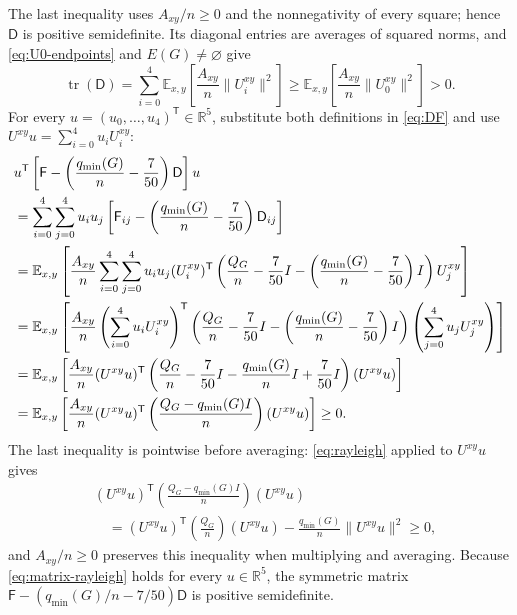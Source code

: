 \documentclass[11pt]{article}
\newcommand{\E}{\mathbb E}
\newcommand{\R}{\mathbb R}
\newcommand{\tr}{\operatorname{tr}}
\newcommand{\qmin}{q_{\min}}
\begin{document}
The last inequality uses $A_{xy}/n\geq0$ and the nonnegativity of every square;
hence $\mathsf D$ is positive semidefinite.
Its diagonal entries are averages of squared norms, and \eqref{eq:U0-endpoints} and $E(G)\ne\varnothing$ give
\begin{equation}\label{eq:positive-D}
\tr(\mathsf D)=\sum_{i=0}^4\E_{x,y}\left[\frac{A_{xy}}n\|U_i^{xy}\|^2\right]
\geq\E_{x,y}\left[\frac{A_{xy}}n\|U_0^{xy}\|^2\right]>0.
\end{equation}
For every $u=(u_0,\ldots,u_4)^{\mathsf T}\in\R^5$,
substitute both definitions in \eqref{eq:DF} and use
$U^{xy}u=\sum_{i=0}^4u_iU_i^{xy}$:
\begin{align}
&u^{\mathsf T}\left[\mathsf F-
\left(\frac{\qmin(G)}n-\frac7{50}\right)\mathsf D\right]u\notag\\
&=\sum_{i=0}^4\sum_{j=0}^4u_i u_j
\left[\mathsf F_{ij}-\left(\frac{\qmin(G)}n-\frac7{50}\right)\mathsf D_{ij}\right]\notag\\
&=\E_{x,y}\left[\frac{A_{xy}}n
\sum_{i=0}^4\sum_{j=0}^4u_i u_j
(U_i^{xy})^{\mathsf T}
\left(\frac{Q_G}{n}
-\frac7{50}I-\left(\frac{\qmin(G)}n-\frac7{50}\right)I\right)
U_j^{xy}\right]\notag\\
&=\E_{x,y}\left[\frac{A_{xy}}n
\left(\sum_{i=0}^4u_iU_i^{xy}\right)^{\mathsf T}
\left(\frac{Q_G}{n}
-\frac7{50}I-\left(\frac{\qmin(G)}n-\frac7{50}\right)I\right)
\left(\sum_{j=0}^4u_jU_j^{xy}\right)\right]\notag\\
&=\E_{x,y}\left[\frac{A_{xy}}n
(U^{xy}u)^{\mathsf T}
\left(\frac{Q_G}{n}
-\frac7{50}I-\frac{\qmin(G)}nI+\frac7{50}I\right)
(U^{xy}u)\right]\notag\\
&=\E_{x,y}\left[\frac{A_{xy}}n
(U^{xy}u)^{\mathsf T}
\left(\frac{Q_G-\qmin(G)I}{n}\right)
(U^{xy}u)\right]\geq0.
\label{eq:matrix-rayleigh}
\end{align}
The last inequality is pointwise before averaging: \eqref{eq:rayleigh}
applied to $U^{xy}u$ gives
\[
\begin{aligned}
&(U^{xy}u)^{\mathsf T}
\left(\frac{Q_G-\qmin(G)I}{n}\right)
(U^{xy}u)\\
&\quad=
(U^{xy}u)^{\mathsf T}
\left(\frac{Q_G}{n}\right)
(U^{xy}u)
-\frac{\qmin(G)}n\|U^{xy}u\|^2
\geq0,
\end{aligned}
\]
and $A_{xy}/n\geq0$ preserves this inequality when multiplying and averaging.
Because \eqref{eq:matrix-rayleigh} holds for every $u\in\R^5$, the symmetric matrix
$\mathsf F-(\qmin(G)/n-7/50)\mathsf D$ is positive semidefinite.
\end{document}

